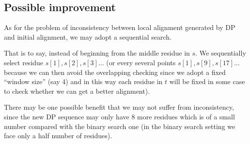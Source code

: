 \documentclass{article}
\begin{document}
\begin{spacing}{1.1}
\section{Possible improvement}
As for the problem of inconsistency between local alignment generated by DP and initial alignment, we may adopt a sequential search.

That is to say, instead of beginning from the middle residue in $s$. We sequentially select residue $s[1],s[2],s[3]\dots$ (or every several points $s[1],s[9],s[17]\dots$ because we can then avoid the overlapping checking since we adopt a fixed ``window size'' (say 4) and in this way each residue in $t$ will be fixed in some case to check whether we can get a better alignment).

There may be one possible benefit that we may not suffer from inconsistency, since the new DP sequence may only have $8$ more residues which is of a small number compared with the binary search one (in the binary search setting we face only a half number of residues).


\end{spacing}
\end{document}
